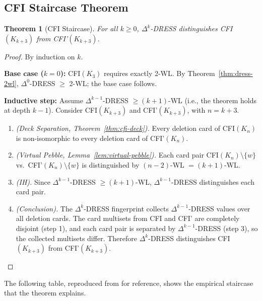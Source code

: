 \documentclass[11pt,a4paper]{article}
\newtheorem{theorem}{Theorem}
\begin{document}
\subsection{CFI Staircase Theorem}

\begin{theorem}[CFI Staircase]
\label{thm:cfi-staircase}
For all $k \geq 0$, $\Delta^k$-DRESS distinguishes CFI$(K_{k+3})$ from CFI'$(K_{k+3})$.
\end{theorem}

\begin{proof}
By induction on $k$.

\textbf{Base case ($k=0$):} CFI$(K_3)$ requires exactly 2-WL. By Theorem~\ref{thm:dress-2wl}, $\Delta^0$-DRESS $\geq$ 2-WL; the base case follows.

\textbf{Inductive step:} Assume $\Delta^{k-1}$-DRESS $\geq (k{+}1)$-WL (i.e., the theorem holds at depth $k-1$). Consider CFI$(K_{k+3})$ and CFI'$(K_{k+3})$, with $n = k+3$.

\begin{enumerate}
    \item \textit{(Deck Separation, Theorem~\ref{thm:cfi-deck}).} Every deletion card of CFI$(K_n)$ is non-isomorphic to every deletion card of CFI'$(K_n)$.
    \item \textit{(Virtual Pebble, Lemma~\ref{lem:virtual-pebble}).} Each card pair CFI$(K_n) \setminus \{w\}$ vs.\ CFI'$(K_n) \setminus \{w\}$ is distinguished by $(n-2)$-WL $= (k{+}1)$-WL.
    \item \textit{(IH).} Since $\Delta^{k-1}$-DRESS $\geq (k{+}1)$-WL, $\Delta^{k-1}$-DRESS distinguishes each card pair.
    \item \textit{(Conclusion).} The $\Delta^k$-DRESS fingerprint collects $\Delta^{k-1}$-DRESS values over all deletion cards. The card multisets from CFI and CFI' are completely disjoint (step 1), and each card pair is separated by $\Delta^{k-1}$-DRESS (step 3), so the collected multisets differ. Therefore $\Delta^k$-DRESS distinguishes CFI$(K_{k+3})$ from CFI'$(K_{k+3})$.
\end{enumerate}
\end{proof}

The following table, reproduced from \cite{castrillo2026dress} for reference, shows the empirical staircase that the theorem explains.
\end{document}

